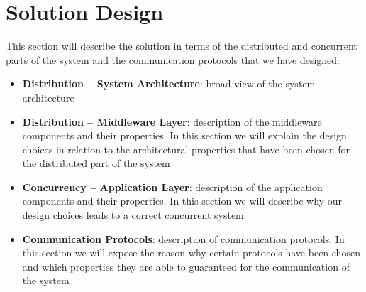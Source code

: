 \section{Solution Design}

This section will describe the solution in terms of the distributed and
concurrent parts of the system and the communication protocols that we have
designed:

\begin{itemize}
\item \textbf{Distribution -- System Architecture}:
  broad view of the system architecture
\item \textbf{Distribution -- Middleware Layer}:
  description of the middleware components and their properties. In this
  section we will explain the design choices in relation to the architectural
  properties that have been chosen for the distributed part of the system
\item \textbf{Concurrency -- Application Layer}:
  description of the application components and their properties. In this
  section we will describe why our design choices leads to a correct concurrent
  system
\item \textbf{Communication Protocols}:
  description of communication protocols. In this section we will expose the
  reason why certain protocols have been chosen and which properties they are
  able to guaranteed for the communication of the system
\end{itemize}










